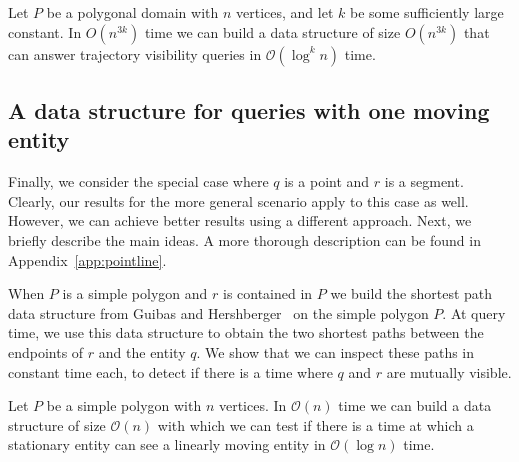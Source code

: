 \documentclass[UKenglish]{lipics-v2019}
\newcommand{\mkmcal}[1]{\ensuremath{\mathcal{#1}}\xspace}
\renewcommand{\O}{\mkmcal{O}}
\begin{document}
\begin{theorem}
 \label{thm:polygonal_moving}
  Let $P$ be a polygonal domain with $n$ vertices, and let $k$ be some sufficiently large constant. In $O(n^{3k})$ time we
  can build a data structure of size $O(n^{3k})$ that can answer
  trajectory visibility queries in $\mathcal{O}(\log^k n)$ time.
\end{theorem}

 
 
 \subsection{A data structure for queries with one moving entity}
 \label{sec:pointline}
 
 Finally, we consider the special case where $q$ is a point and $r$ is a segment.
 Clearly, our results for the more general scenario apply to this case as well. However, we can achieve better results using a different approach. Next, we briefly describe the main ideas. A more thorough description can be found in Appendix~\ref{app:pointline}.
 
 When $P$ is a simple polygon and $r$ is contained in $P$ we build the shortest path data structure from Guibas and Hershberger~\cite{guibas1989optimal} on the simple polygon $P$. At query time, we use this data structure to obtain the two shortest paths between the endpoints of $r$ and the entity $q$. We show that we can inspect these paths in constant time each, to detect if there is a time where $q$ and $r$ are mutually visible.
 
\begin{theorem}
\label{thm:one_dead_one_alive}
  Let $P$ be a simple polygon with $n$ vertices. In $\O(n)$ time we
  can build a data structure of size $\O(n)$ with which we can test if
  there is a time at which a stationary entity can see a linearly
  moving entity in $\O(\log n)$ time.
\end{theorem}
 
\end{document}
